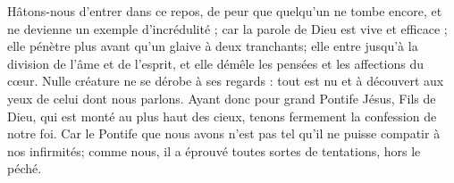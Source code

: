 Hâtons-nous d’entrer dans ce repos, de peur que quelqu’un ne tombe encore, et ne devienne un exemple d’incrédulité ; car la parole de Dieu est vive et efficace ; elle pénètre plus avant qu’un glaive à deux tranchants; elle entre jusqu’à la division de l’âme et de l’esprit, et elle démêle les pensées et les affections du cœur. Nulle créature ne se dérobe à ses regards : tout est nu et à découvert aux yeux de celui dont nous parlons. Ayant donc pour grand Pontife Jésus, Fils de Dieu, qui est monté au plus haut des cieux, tenons fermement la confession de notre foi. Car le Pontife que nous avons n’est pas tel qu’il ne puisse compatir à nos infirmités; comme nous, il a éprouvé toutes sortes de tentations, hors le péché.